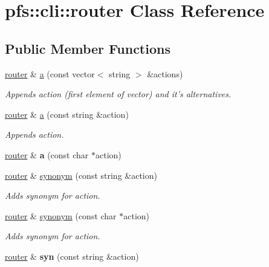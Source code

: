 \hypertarget{classpfs_1_1cli_1_1router}{\section{pfs\-:\-:cli\-:\-:router Class Reference}
\label{classpfs_1_1cli_1_1router}
}
\subsection*{Public Member Functions}
\begin{DoxyCompactItemize}
\item 
\hyperlink{classpfs_1_1cli_1_1router}{router} \& \hyperlink{classpfs_1_1cli_1_1router_ad1372186a8ae4d6c894f4e3ee99ae0c7}{a} (const vector$<$ string $>$ \&actions)
\begin{DoxyCompactList}\small\item\em Appends action (first element of vector) and it's alternatives. \end{DoxyCompactList}\item 
\hyperlink{classpfs_1_1cli_1_1router}{router} \& \hyperlink{classpfs_1_1cli_1_1router_ae429df186a1a6063ef18721766b81f28}{a} (const string \&action)
\begin{DoxyCompactList}\small\item\em Appends action. \end{DoxyCompactList}\item 
\hypertarget{classpfs_1_1cli_1_1router_a7a87166e6632404d92a19b6ae8fdc8a1}{\hyperlink{classpfs_1_1cli_1_1router}{router} \& {\bfseries a} (const char $\ast$action)}\label{classpfs_1_1cli_1_1router_a7a87166e6632404d92a19b6ae8fdc8a1}

\item 
\hyperlink{classpfs_1_1cli_1_1router}{router} \& \hyperlink{classpfs_1_1cli_1_1router_aaadb7eb9699252dce1931a47d2b7a9c0}{synonym} (const string \&action)
\begin{DoxyCompactList}\small\item\em Adds synonym for action. \end{DoxyCompactList}\item 
\hyperlink{classpfs_1_1cli_1_1router}{router} \& \hyperlink{classpfs_1_1cli_1_1router_acc6fda315239e045e0c6e89e84e6825f}{synonym} (const char $\ast$action)
\begin{DoxyCompactList}\small\item\em Adds synonym for action. \end{DoxyCompactList}\item 
\hypertarget{classpfs_1_1cli_1_1router_a6f2bb18b9b9eeedfc3fd77b5d34e6c36}{\hyperlink{classpfs_1_1cli_1_1router}{router} \& {\bfseries syn} (const string \&action)}\label{classpfs_1_1cli_1_1router_a6f2bb18b9b9eeedfc3fd77b5d34e6c36}


\end{DoxyCompactItemize}
